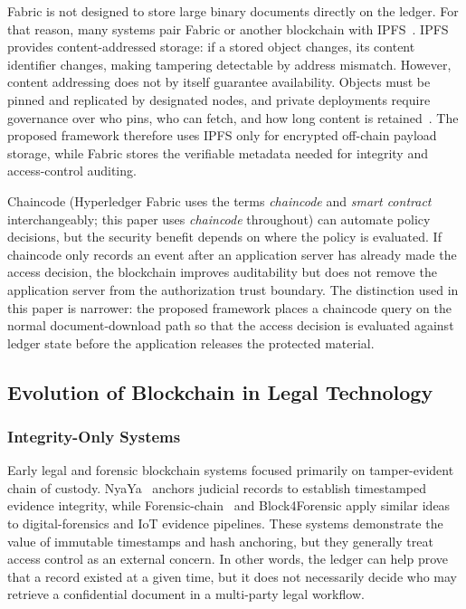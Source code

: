\documentclass{ieeeaccess}
\begin{document}
Fabric is not designed to store large binary documents directly on the
ledger. For that reason, many systems pair Fabric or another
blockchain with IPFS~\cite{benet2014ipfs}. IPFS provides
content-addressed storage: if a stored object changes, its content
identifier changes, making tampering detectable by address mismatch.
However, content addressing does not by itself guarantee availability.
Objects must be pinned and replicated by designated nodes, and private
deployments require governance over who pins, who can fetch, and how
long content is retained~\cite{ipfsDocsQuickstartPin2025,
ipfsDocsKuboGarbageCollection}. The proposed framework therefore uses
IPFS only for encrypted off-chain payload storage, while Fabric stores
the verifiable metadata needed for integrity and access-control
auditing.

Chaincode (Hyperledger Fabric uses the terms \emph{chaincode}
and \emph{smart contract} interchangeably; this paper uses
\emph{chaincode} throughout) can automate policy decisions, but the security
benefit depends on where the policy is evaluated. If chaincode only
records an event after an application server has already made the
access decision, the blockchain improves auditability but does not
remove the application server from the authorization trust boundary.
The distinction used in this paper is narrower: the proposed framework
places a chaincode query on the normal document-download path so that
the access decision is evaluated against ledger state before the
application releases the protected material.

\subsection{Evolution of Blockchain in Legal Technology}
\label{sec:evolution}

\subsubsection{Integrity-Only Systems}

Early legal and forensic blockchain systems focused primarily on
tamper-evident chain of custody. NyaYa~\cite{verma2021nyaya} anchors
judicial records to establish timestamped evidence integrity, while
Forensic-chain~\cite{lone2019forensic} and Block4Forensic
\cite{cebe2018block} apply similar ideas to digital-forensics and IoT
evidence pipelines. These systems demonstrate the value of immutable
timestamps and hash anchoring, but they generally treat access control
as an external concern. In other words, the ledger can help prove that
a record existed at a given time, but it does not necessarily decide
who may retrieve a confidential document in a multi-party legal
workflow.
\end{document}

